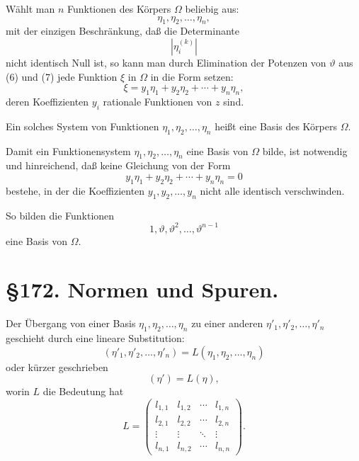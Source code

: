 \documentclass[12pt,a4paper]{article}
\theoremstyle{definition}
\begin{document}
Wählt man $n$ Funktionen des Körpers $\Omega$ beliebig aus:
\[\eta_1, \eta_2, \ldots, \eta_n,\]
mit der einzigen Beschränkung, daß die Determinante
\[\left|\eta_i^{(k)}\right|\]
nicht identisch Null ist, so kann man durch Elimination der Potenzen von $\vartheta$ aus (6) und (7) jede Funktion $\xi$ in $\Omega$ in die Form setzen:
\begin{equation}
\xi = y_1 \eta_1 + y_2 \eta_2 + \cdots + y_n \eta_n,
\end{equation}
deren Koeffizienten $y_i$ rationale Funktionen von $z$ sind.

Ein solches System von Funktionen $\eta_1, \eta_2, \ldots, \eta_n$ heißt eine Basis des Körpers $\Omega$.

Damit ein Funktionensystem $\eta_1, \eta_2, \ldots, \eta_n$ eine Basis von $\Omega$ bilde, ist notwendig und hinreichend, daß keine Gleichung von der Form
\[y_1 \eta_1 + y_2 \eta_2 + \cdots + y_n \eta_n = 0\]
bestehe, in der die Koeffizienten $y_1, y_2, \ldots, y_n$ nicht alle identisch verschwinden.

So bilden die Funktionen
\[1, \vartheta, \vartheta^2, \ldots, \vartheta^{n-1}\]
eine Basis von $\Omega$.

\newpage
\section*{\S 172. Normen und Spuren.}

Der Übergang von einer Basis $\eta_1, \eta_2, \ldots, \eta_n$ zu einer anderen $\eta'_1, \eta'_2, \ldots, \eta'_n$ geschieht durch eine lineare Substitution:
\begin{equation}
(\eta'_1, \eta'_2, \ldots, \eta'_n) = L(\eta_1, \eta_2, \ldots, \eta_n)
\end{equation}
oder kürzer geschrieben
\begin{equation}
(\eta') = L(\eta),
\end{equation}
worin $L$ die Bedeutung hat
\begin{equation}
L = \begin{pmatrix}
l_{1,1} & l_{1,2} & \cdots & l_{1,n} \\
l_{2,1} & l_{2,2} & \cdots & l_{2,n} \\
\vdots & \vdots & \ddots & \vdots \\
l_{n,1} & l_{n,2} & \cdots & l_{n,n}
\end{pmatrix}.
\end{equation}
\end{document}
